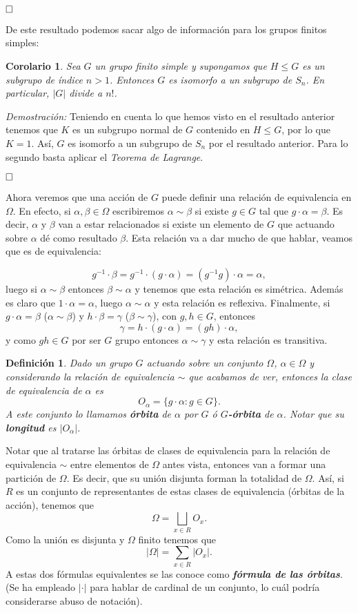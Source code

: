 \documentclass[12pt]{article}
\newtheorem{definition}[theorem]{Definición}
\newtheorem{corolario}{Corolario}[theorem]
\begin{document}
$\hfill \square$

De este resultado podemos sacar algo de información para los grupos finitos simples:

\begin{corolario}Sea $G$ un grupo finito simple y supongamos que $H \leq G$ es un subgrupo de índice $n > 1$. Entonces $G$ es isomorfo a un subgrupo de $S_n$. En particular, $|G|$ divide a $n!$.
\end{corolario}
\emph{Demostración: }Teniendo en cuenta lo que hemos visto en el resultado anterior tenemos que $K$ es un subgrupo normal de $G$ contenido en $H\leq G$, por lo que $K = 1$. Así, $G$ es isomorfo a un subgrupo de $S_n$ por el resultado anterior. Para lo segundo basta aplicar el \textit{Teorema de Lagrange}.

$\hfill \square$

Ahora veremos que una acción de $G$ puede definir una relación de equivalencia en $\Omega$. En efecto, si $\alpha, \beta \in \Omega$ escribiremos $\alpha \sim \beta $ si existe $g \in G$ tal que $g \cdot \alpha = \beta$. Es decir, $\alpha$ y $\beta$ van a estar relacionados si existe un elemento de $G$ que actuando sobre $\alpha$ dé como resultado $\beta$. Esta relación va a dar mucho de que hablar, veamos que es de equivalencia:

$$g^{-1} \cdot \beta = g^{-1} \cdot (g \cdot \alpha ) = (g^{-1}g) \cdot \alpha = \alpha, $$ luego si $\alpha \sim \beta$ entonces $\beta \sim \alpha$ y tenemos que esta relación es simétrica. Además es claro que $1 \cdot \alpha = \alpha$, luego $\alpha \sim \alpha$ y esta relación es reflexiva. Finalmente, si $g \cdot \alpha = \beta$ ($\alpha \sim \beta$) y $h \cdot \beta = \gamma$ ($\beta \sim \gamma$), con $g, h \in G$, entonces $$\gamma = h \cdot (g \cdot \alpha) = (gh) \cdot \alpha,$$ y como $gh \in G$ por ser $G$ grupo entonces $\alpha \sim \gamma$ y esta relación es transitiva.

\begin{definition}Dado un grupo $G$ actuando sobre un conjunto $\Omega$, $\alpha \in \Omega$ y considerando la relación de equivalencia $\sim$ que acabamos de ver, entonces la clase de equivalencia de $\alpha$ es $$O_{\alpha} = \lbrace g\cdot \alpha : g \in G \rbrace.$$ A este conjunto lo llamamos \textbf{órbita} de $\alpha$ por $G$ ó \textbf{$G$-órbita} de $\alpha$. Notar que su \textbf{longitud} es $|O_{\alpha}|$.
\end{definition}

Notar que al tratarse las órbitas de clases de equivalencia para la relación de equivalencia $\sim$ entre elementos de $\Omega$ antes vista, entonces van a formar una partición de $\Omega.$ Es decir, que su unión disjunta forman la totalidad de $\Omega$. Así, si $R$ es un conjunto de representantes de estas clases de equivalencia (órbitas de la acción), tenemos que $$\Omega = \bigsqcup_{x\in R} O_x.$$ Como la unión es disjunta y $\Omega$ finito tenemos que $$|\Omega | = \sum_{x\in R} |O_x|.$$ A estas dos fórmulas equivalentes se las conoce como \textbf{\textit{fórmula de las órbitas}}. (Se ha empleado $|\cdot|$ para hablar de cardinal de un conjunto, lo cuál podría considerarse abuso de notación).
\end{document}
